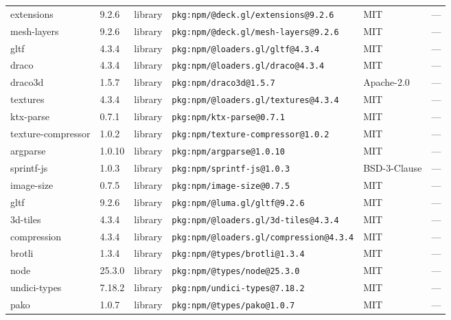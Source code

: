 \documentclass[11pt,a4paper]{article}
\begin{document}
\begin{longtable}{|p{4cm}|p{2cm}|p{1.6cm}|p{5cm}|p{1.5cm}|p{3.5cm}|}
\raggedright extensions & 9.2.6 & library & \small\texttt{pkg:npm/@deck.gl/extensions@9.2.6} & MIT & \small — \\
\raggedright mesh-layers & 9.2.6 & library & \small\texttt{pkg:npm/@deck.gl/mesh-layers@9.2.6} & MIT & \small — \\
\raggedright gltf & 4.3.4 & library & \small\texttt{pkg:npm/@loaders.gl/gltf@4.3.4} & MIT & \small — \\
\raggedright draco & 4.3.4 & library & \small\texttt{pkg:npm/@loaders.gl/draco@4.3.4} & MIT & \small — \\
\raggedright draco3d & 1.5.7 & library & \small\texttt{pkg:npm/draco3d@1.5.7} & Apache-2.0 & \small — \\
\raggedright textures & 4.3.4 & library & \small\texttt{pkg:npm/@loaders.gl/textures@4.3.4} & MIT & \small — \\
\raggedright ktx-parse & 0.7.1 & library & \small\texttt{pkg:npm/ktx-parse@0.7.1} & MIT & \small — \\
\raggedright texture-compressor & 1.0.2 & library & \small\texttt{pkg:npm/texture-compressor@1.0.2} & MIT & \small — \\
\raggedright argparse & 1.0.10 & library & \small\texttt{pkg:npm/argparse@1.0.10} & MIT & \small — \\
\raggedright sprintf-js & 1.0.3 & library & \small\texttt{pkg:npm/sprintf-js@1.0.3} & BSD-3-Clause & \small — \\
\raggedright image-size & 0.7.5 & library & \small\texttt{pkg:npm/image-size@0.7.5} & MIT & \small — \\
\raggedright gltf & 9.2.6 & library & \small\texttt{pkg:npm/@luma.gl/gltf@9.2.6} & MIT & \small — \\
\raggedright 3d-tiles & 4.3.4 & library & \small\texttt{pkg:npm/@loaders.gl/3d-tiles@4.3.4} & MIT & \small — \\
\raggedright compression & 4.3.4 & library & \small\texttt{pkg:npm/@loaders.gl/compression@4.3.4} & MIT & \small — \\
\raggedright brotli & 1.3.4 & library & \small\texttt{pkg:npm/@types/brotli@1.3.4} & MIT & \small — \\
\raggedright node & 25.3.0 & library & \small\texttt{pkg:npm/@types/node@25.3.0} & MIT & \small — \\
\raggedright undici-types & 7.18.2 & library & \small\texttt{pkg:npm/undici-types@7.18.2} & MIT & \small — \\
\raggedright pako & 1.0.7 & library & \small\texttt{pkg:npm/@types/pako@1.0.7} & MIT & \small — \\

\end{longtable}
\end{document}
